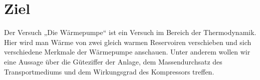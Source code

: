 \section{Ziel}
\label{sec:Ziel}
\setlength{\parindent}{0pt}
Der Versuch „Die Wärmepumpe“ ist ein Versuch im Bereich der Thermodynamik.
Hier wird man Wärme von zwei gleich warmen Reservoiren verschieben und sich 
verschiedene Merkmale der Wärmepumpe anschauen.
Unter anderem wollen wir eine Aussage über die Güteziffer der Anlage,
dem Massendurchsatz des Transportmediums und dem Wirkungsgrad des Kompressors treffen.